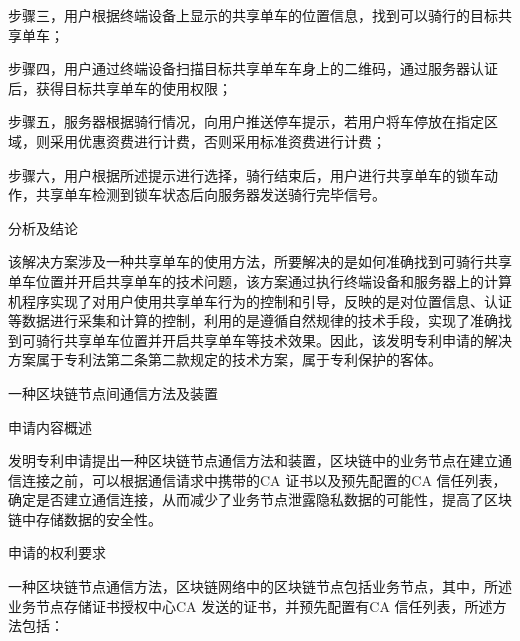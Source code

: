 {\setlength{\parindent}{20.6bp}步骤三，用户根据终端设备上显示的共享单车的位置信息，找到可以骑行的目标共享单车；\par}

{\setlength{\parindent}{20.6bp}步骤四，用户通过终端设备扫描目标共享单车车身上的二维码，通过服务器认证后，获得目标共享单车的使用权限；\par}

{\setlength{\parindent}{20.6bp}步骤五，服务器根据骑行情况，向用户推送停车提示，若用户将车停放在指定区域，则采用优惠资费进行计费，否则采用标准资费进行计费；\par}

{\setlength{\parindent}{20.6bp}步骤六，用户根据所述提示进行选择，骑行结束后，用户进行共享单车的锁车动作，共享单车检测到锁车状态后向服务器发送骑行完毕信号。\par}

{\setlength{\parindent}{20.1bp}分析及结论\par}

{\setlength{\parindent}{20.6bp}该解决方案涉及一种共享单车的使用方法，所要解决的是如何准确找到可骑行共享单车位置并开启共享单车的技术问题，该方案通过执行终端设备和服务器上的计算机程序实现了对用户使用共享单车行为的控制和引导，反映的是对位置信息、认证等数据进行采集和计算的控制，利用的是遵循自然规律的技术手段，实现了准确找到可骑行共享单车位置并开启共享单车等技术效果。因此，该发明专利申请的解决方案属于专利法第二条第二款规定的技术方案，属于专利保护的客体。\par}

{\setlength{\parindent}{15.3bp}\par}

{\setlength{\parindent}{20.6bp}一种区块链节点间通信方法及装置\par}

{\setlength{\parindent}{20.1bp}申请内容概述\par}

{\setlength{\parindent}{20.6bp}发明专利申请提出一种区块链节点通信方法和装置，区块链中的业务节点在建立通信连接之前，可以根据通信请求中携带的CA 证书以及预先配置的CA 信任列表，确定是否建立通信连接，从而减少了业务节点泄露隐私数据的可能性，提高了区块链中存储数据的安全性。\par}

{\setlength{\parindent}{20.1bp}申请的权利要求\par}

{\setlength{\parindent}{20.6bp}一种区块链节点通信方法，区块链网络中的区块链节点包括业务节点，其中，所述业务节点存储证书授权中心CA 发送的证书，并预先配置有CA 信任列表，所述方法包括：\par}

